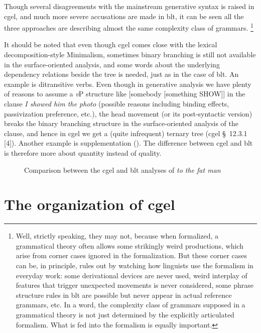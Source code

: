 \documentclass{article}
\newcommand*{\citesec}[1]{\S~{#1}}
\newcommand*{\corpus}[1]{\emph{#1}}
\newcommand*{\vP}{\textit{v}P}
\begin{document}
Though several disagreements with the mainstream generative syntax is raised in \ac{cgel},
and much more severe accusations are made in \ac{blt},
it can be seen all the three approaches are describing almost the same complexity class of grammars.%
\footnote{
    Well, strictly speaking, they may not,
    because when formalized, a grammatical theory often allows some strikingly weird productions,
    which arise from corner cases ignored in the formalization.
    But these corner cases can be, in principle, rules out by watching 
    how linguists use the formalism in everyday work:
    some derivational devices are never used, 
    weird interplay of features that trigger unexpected movements is never considered,
    some phrase structure rules in \ac{blt} are possible but never appear in actual reference grammars, etc.
    In a word, the complexity class of grammars supposed in a grammatical theory 
    is not just determined by the explicitly articulated formalism.
    What is fed into the formalism is equally important.
}

It should be noted that even though \ac{cgel} comes close with the lexical decomposition-style Minimalism,
sometimes binary branching is still not available in the surface-oriented analysis,
and some words about the underlying dependency relations beside the tree is needed,
just as in the case of \ac{blt}.
An example is ditransitive verbs. 
Even though in generative analysis we have plenty of reasons to assume a \vP{} structure like 
[somebody [something SHOW]] in the clause \corpus{I showed him the photo}
(possible reasons including binding effects, passivization preference, etc.),
the head movement (or its post-syntactic version) breaks the binary branching structure 
in the surface-oriented analysis of the clause,
and hence in \ac{cgel} we get a (quite infrequent) ternary tree (\ac{cgel} \citesec{12.3.1} [4]). 
Another example is supplementation ().
The difference between \ac{cgel} and \ac{blt} is therefore more about quantity instead of quality.

\begin{figure}
    \centering
    
    \caption{Comparison between the \ac{cgel} and \ac{blt} analyses of \corpus{to the fat man}}
    \label{fig:to-the-fat-man-blt}
\end{figure}

\section{The organization of \ac{cgel}}
\end{document}
